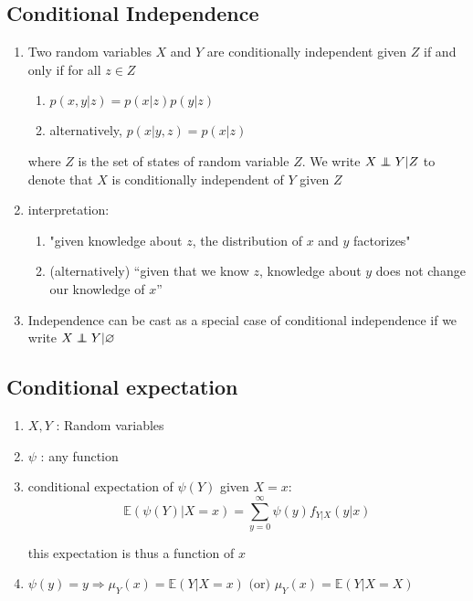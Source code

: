 \subsection{Conditional Independence \cite{mfml-1}} \label{Conditional Independence}

\begin{enumerate}
    \item Two random variables $X$ and $Y$ are conditionally independent given $Z$ if and only if for all $z \in Z$
    \begin{enumerate}
        \item $p(x, y | z) = p(x | z)p(y | z)$
        \item alternatively, $p(x | y, z) = p(x | z)$
    \end{enumerate}

    where $Z$ is the set of states of random variable $Z$. We write $X \perp\!\!\!\!\perp Y | Z$ to denote that $X$ is conditionally independent of $Y$ given $Z$

    \item interpretation:
    \begin{enumerate}
        \item "given knowledge about $z$, the distribution of $x$ and $y$ factorizes"

        \item (alternatively) “given that we know $z$, knowledge about $y$ does not change our knowledge of $x$”
    \end{enumerate}

    \item Independence can be cast as a special case of conditional independence if we write $X \perp\!\!\!\!\perp Y | \varnothing$
\end{enumerate}


\subsection{Conditional expectation \cite{ism-1}} \label{Conditional expectation}

\begin{enumerate}
    \item[] $X, Y$ : Random variables
    
    \item[] $\psi$ : any function

    \item conditional expectation of $\psi(Y)$ given $X = x$:
    \[
        \mathbb{E}(\psi(Y)|X=x)
        = \displaystyle\sum_{y=0}^{\infty}
        \psi(y)f_{Y|X}(y|x)
    \]

    this expectation is thus a function of $x$

    \item $
        \psi(y) = y
        \Rightarrow
        \mu_Y(x) = \mathbb{E}(Y|X = x)
        \text{ (or) }
        \mu_Y(x) = \mathbb{E}(Y|X = X)
    $
\end{enumerate}


